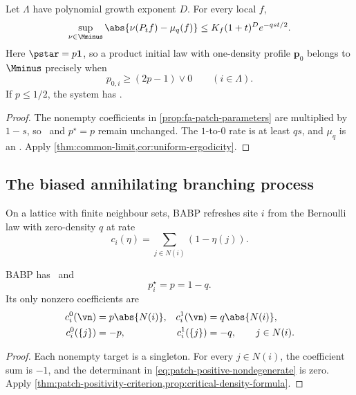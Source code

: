 \begin{corollary}[Soft FA-1f]
\label{cor:soft-fa}
Let \(\Lambda\) have polynomial growth exponent \(D\). For every local
\(f\),
\[
  \sup_{\nu\in\Mminus}
  \abs{\nu(P_tf)-\mu_q(f)}
  \le
  K_f(1+t)^D e^{-qst/2}.
\]
Here \(\pstar=p\mathbf1\), so a product initial law with one-density
profile \(\mathbf p_0\) belongs to \(\Mminus\) precisely when
\[
  p_{0,i}\ge(2p-1)\vee0
  \qquad(i\in\Lambda).
\]
If \(p\le1/2\), the system has
\uniformexponentialergodicity.
\end{corollary}

\begin{proof}
The nonempty coefficients in \cref{prop:fa-patch-parameters} are
multiplied by \(1-s\), so \patchpositivity\ and \(p^\star=p\) remain
unchanged. The \(1\)-to-\(0\) rate is at least \(qs\), and
\(\mu_q\) is an \invariantmeasure. Apply
\cref{thm:common-limit,cor:uniform-ergodicity}.
\end{proof}

\subsection{The biased annihilating branching process}

\begin{definition}
\label{def:babp}
On a lattice with finite neighbour sets, BABP refreshes site \(i\)
from the Bernoulli law with zero-density \(q\) at rate
\[
  c_i(\eta)
  =
  \sum_{j\in N(i)}(1-\eta(j)).
\]
\end{definition}

\begin{proposition}
\label{prop:babp-patch-parameters}
BABP has \patchpositivity\ and
\[
  p_i^\star=p=1-q.
\]
Its only nonzero coefficients are
\begin{align*}
  c_i^0(\vn)&=p\abs{N(i)},
  &
  c_i^1(\vn)&=q\abs{N(i)},
  \\
  c_i^0(\{j\})&=-p,
  &
  c_i^1(\{j\})&=-q,
  \qquad j\in N(i).
\end{align*}
\end{proposition}

\begin{proof}
Each nonempty target is a singleton. For every \(j\in N(i)\), the
coefficient sum is \(-1\), and the determinant in
\eqref{eq:patch-positive-nondegenerate} is zero. Apply
\cref{thm:patch-positivity-criterion,prop:critical-density-formula}.
\end{proof}

